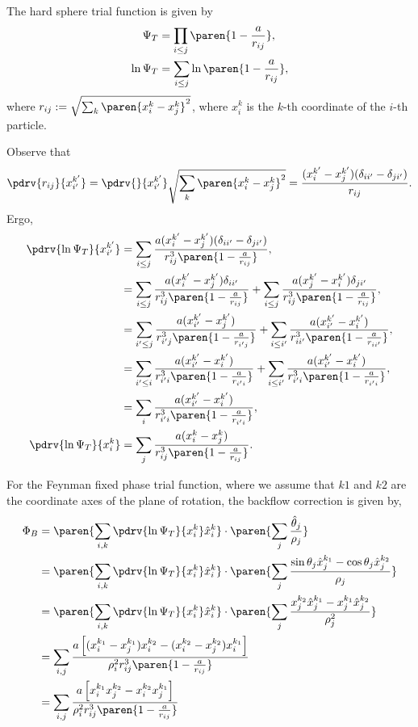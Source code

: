 \documentclass[onecolumn,amsmath,amssymb,nofootinbib,floatfix]{revtex4}
\begin{document}
The hard sphere trial function is given by
$$
\begin{aligned}
\Psi_T &= \prod_{i\le j} \paren{1-\frac{a}{r_{ij}}}, \\
\ln \Psi_T &= \sum_{i\le j} \ln\paren{1-\frac{a}{r_{ij}}}, \\
\end{aligned}
$$
where $r_{ij} := \sqrt{\sum_k \paren{x_i^k-x_j^k}^2}$, where $x_i^k$ is the $k$-th coordinate of the $i$-th particle.

Observe that
$$\pdrv{r_{ij}}{x_{i'}^{k'}} = \pdrv{}{x_{i'}^{k'}} \sqrt{\sum_k \paren{x_i^k-x_j^k}^2} = \frac{(x_i^{k'}-x_j^{k'})(\delta_{ii'}-\delta_{ji'})}{r_{ij}}.$$
Ergo,
$$
\begin{aligned}
\pdrv{\ln \Psi_T}{x_{i'}^{k'}}
&= \sum_{i\le j}\frac{a(x_i^{k'}-x_j^{k'})(\delta_{ii'}-\delta_{ji'})}{r_{ij}^3\paren{1-\frac{a}{r_{ij}}}},\\
&= \sum_{i\le j}\frac{a(x_i^{k'}-x_j^{k'})\delta_{ii'}}{r_{ij}^3\paren{1-\frac{a}{r_{ij}}}}+\sum_{i\le j}\frac{a(x_j^{k'}-x_i^{k'})\delta_{ji'}}{r_{ij}^3\paren{1-\frac{a}{r_{ij}}}},\\
&= \sum_{i'\le j}\frac{a(x_{i'}^{k'}-x_j^{k'})}{r_{{i'}j}^3\paren{1-\frac{a}{r_{{i'}j}}}}+\sum_{i\le {i'}}\frac{a(x_{i'}^{k'}-x_i^{k'})}{r_{i{i'}}^3\paren{1-\frac{a}{r_{i{i'}}}}},\\
&= \sum_{i'\le i}\frac{a(x_{i'}^{k'}-x_i^{k'})}{r_{{i'}i}^3\paren{1-\frac{a}{r_{{i'}i}}}}+\sum_{i\le {i'}}\frac{a(x_{i'}^{k'}-x_i^{k'})}{r_{{i'}i}^3\paren{1-\frac{a}{r_{{i'}i}}}},\\
&= \sum_{i}\frac{a(x_{i'}^{k'}-x_i^{k'})}{r_{{i'}i}^3\paren{1-\frac{a}{r_{{i'}i}}}},\\
\pdrv{\ln \Psi_T}{x_i^k} &= \sum_j\frac{a(x_i^k-x_j^k)}{r_{ij}^3\paren{1-\frac{a}{r_{ij}}}}.\\
\end{aligned}
$$

For the Feynman fixed phase trial function, where we assume that $k1$ and $k2$ are the coordinate axes of the plane of rotation, the backflow correction is given by,
$$
\begin{aligned}
\Phi_{B}
&=\paren{\sum_{i,k} \pdrv{\ln\Psi_T}{x_i^k} \hat x_i^k}\cdot \paren{\sum_j\frac{\hat\theta_j}{\rho_j}} \\
&=\paren{\sum_{i,k} \pdrv{\ln\Psi_T}{x_i^k} \hat x_i^k}\cdot \paren{\sum_j\frac{\sin\theta_j \hat x_j^{k_1} - \cos\theta_j \hat x_j^{k_2}}{\rho_j}} \\
&=\paren{\sum_{i,k} \pdrv{\ln\Psi_T}{x_i^k} \hat x_i^k}\cdot \paren{\sum_j\frac{x_j^{k_2}\hat x_j^{k_1} - x_j^{k_1}\hat x_j^{k_2}}{\rho_j^2}} \\
&=\sum_{i,j} \frac{a\left[(x_i^{k_1}-x_j^{k_1})x_i^{k_2}-(x_i^{k_2}-x_j^{k_2})x_i^{k_1}\right]}{\rho_i^2 r_{ij}^3\paren{1-\frac{a}{r_{ij}}}} \\
&=\sum_{i,j} \frac{a\left[x_i^{k_1}x_j^{k_2}-x_i^{k_2}x_j^{k_1}\right]}{\rho_i^2 r_{ij}^3\paren{1-\frac{a}{r_{ij}}}} \\
\end{aligned}
$$
\end{document}
